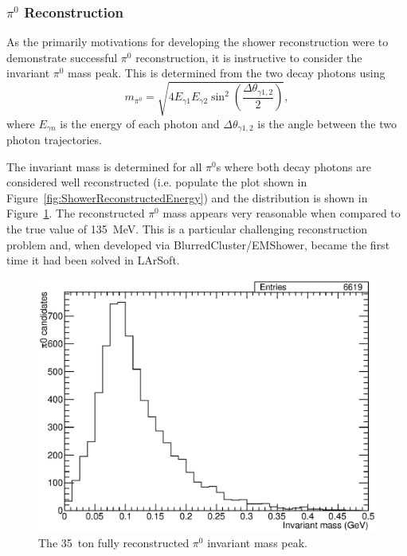 \subsubsection{$\pi^0$ Reconstruction}\label{sec:pi0Reconstruction}

As the primarily motivations for developing the shower reconstruction were to demonstrate successful $\pi^0$ reconstruction, it is instructive to consider the invariant $\pi^0$ mass peak.  This is determined from the two decay photons using
\begin{equation}
  m_{\pi^0} = \sqrt{4 E_{\gamma 1} E_{\gamma 2} \sin^2{\left( \frac{\Delta \theta_{\gamma 1,2}}{2} \right)}},
\end{equation}
where $E_{\gamma n}$ is the energy of each photon and $\Delta \theta_{\gamma 1,2}$ is the angle between the two photon trajectories.

The invariant mass is determined for all $\pi^0$s where both decay photons are considered well reconstructed (i.e. populate the plot shown in Figure~\ref{fig:ShowerReconstructedEnergy}) and the distribution is shown in Figure~\ref{fig:Pi0MassPeak}.  The reconstructed $\pi^0$ mass appears very reasonable when compared to the true value of 135~MeV.  This is a particular challenging reconstruction problem and, when developed via BlurredCluster/EMShower, became the first time it had been solved in LArSoft.

\begin{figure}
  \centering
  \includegraphics[width=12cm]{Pi0MassPeak.eps}
  \caption[The 35~ton fully reconstructed $\pi^0$ invariant mass peak.]{The 35~ton fully reconstructed $\pi^0$ invariant mass peak.}
  \label{fig:Pi0MassPeak}
\end{figure}

